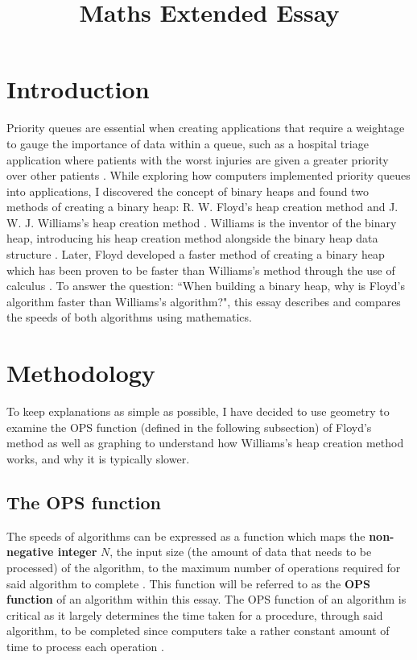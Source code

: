 \documentclass[12pt]{article}
\title{Maths Extended Essay}
\date{}
\begin{document}

\setlength\parindent{0pt}
\setlength{\footskip}{1in} %
\addtolength{\jot}{1em}%
\tableofcontents
\newpage

\section{Introduction}
Priority queues are essential when creating applications that require a weightage to gauge the importance of data within a queue, such as a hospital triage application where patients with the worst injuries are given a greater priority over other patients \parencite{cornell_fall_2020}. While exploring how computers implemented priority queues into applications, I discovered the concept of binary heaps and found two methods of creating a binary heap: R. W. Floyd’s heap creation method and J. W. J. Williams’s heap creation method \parencite[58]{JCC}. Williams is the inventor of the binary heap, introducing his heap creation method alongside the binary heap data structure \parencite{ACM_1964_algorithms}. Later, Floyd developed a faster method of creating a binary heap which has been proven to be faster than Williams’s method through the use of calculus \parencite[28]{skiena_lecture}. To answer the question: ``When building a binary heap, why is Floyd’s algorithm faster than Williams’s algorithm?", this essay describes and compares the speeds of both algorithms using mathematics.

\section{Methodology}
To keep explanations as simple as possible, I have decided to use geometry to examine the OPS function (defined in the following subsection) of Floyd’s method as well as graphing to understand how Williams’s heap creation method works, and why it is typically slower.

\subsection{The OPS function}
The speeds of algorithms can be expressed as a function which maps the \textbf{non-negative integer} $N$, the input size (the amount of data that needs to be processed) of the algorithm, to the maximum number of operations required for said algorithm to complete \parencite{time_complexity}. This function will be referred to as the \textbf{OPS function} of an algorithm within this essay. The OPS function of an algorithm is critical as it largely determines the time taken for a procedure, through said algorithm, to be completed since computers take a rather constant amount of time to process each operation \parencite{pc_takes_time}.\newline
\end{document}
